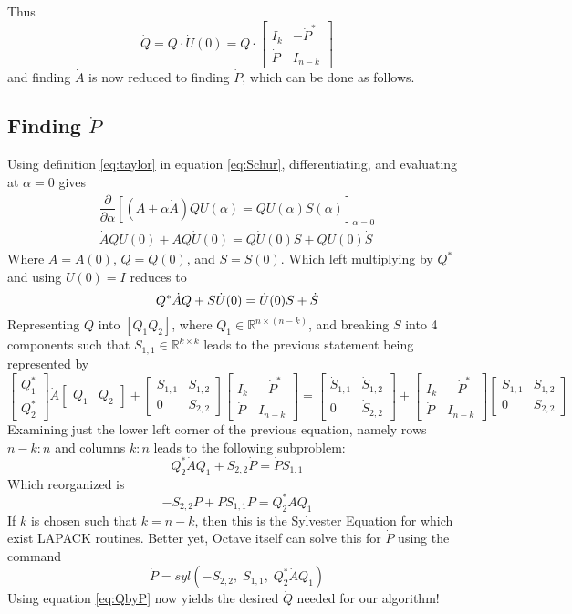 \documentclass[fleqn,12pt]{article}
\newcommand{\bmatTt}[2]{\begin{bmatrix} #1 \\ #2 \end{bmatrix}}
\newcommand{\bmatTw}[2]{\begin{bmatrix} #1 & #2 \end{bmatrix}}
\newcommand{\bmatF}[4]{\begin{bmatrix} #1 & #2\\ #3 & #4 \end{bmatrix}}
\begin{document}
Thus
\begin{equation}\label{eq:QbyP}
  \dot{Q} = Q \cdot \dot{U}(0) = Q \cdot \begin{bmatrix}
    I_k & - \dot{P}^*\\
    \dot{P} & I_{n-k}
  \end{bmatrix}
\end{equation}
and finding $\dot{A}$ is now reduced to finding $\dot{P}$, which can be done as follows.

\subsection{Finding $\dot{P}$}

Using definition \ref{eq:taylor} in equation \ref{eq:Schur}, differentiating, and evaluating at $\alpha = 0$ gives
\begin{gather}
  \dfrac{\partial}{\partial \alpha} 
  \left[ 
    (A + \alpha \dot{A}) Q U(\alpha) = Q U(\alpha) S(\alpha)  
  \right]_{\alpha = 0}\\
  \dot{A} Q U(0) + A Q \dot{U}(0) = Q \dot{U}(0) S + Q U(0) \dot{S}
\end{gather}
Where $A = A(0)$, $Q = Q(0)$, and $S = S(0)$.
Which left multiplying by $Q^*$ and using $U(0) = I$ reduces to
\begin{equation}
  Q^* \dot{A} Q + S \dot{U}(0) = \dot{U}(0) S + \dot{S}\\
\end{equation}
Representing $Q$ into $[ Q_1 Q_2]$, where $Q_1 \in \mathbb{R}^{n \times (n-k)}$,
and breaking $S$ into 4 components such that $S_{1,1} \in \mathbb{R}^{k \times k}$ leads
to the previous statement being represented by
\begin{equation}
  \bmatTt{Q_1^*}{Q_2^*} \dot{A} \bmatTw{Q_1}{Q_2} + 
  \bmatF{S_{1,1}}{S_{1,2}}{0}{S_{2,2}} \bmatF{I_k}{-\dot{P}^*}{\dot{P}}{I_{n-k}} = 
  \bmatF{\dot{S}_{1,1}}{\dot{S}_{1,2}}{0}{\dot{S}_{2,2}} + 
  \bmatF{I_k}{-\dot{P}^*}{\dot{P}}{I_{n-k}} \bmatF{S_{1,1}}{S_{1,2}}{0}{S_{2,2}}
\end{equation}
Examining just the lower left corner of the previous equation, namely rows $n-k : n$ and columns $k:n$
leads to the following subproblem:
\begin{equation}
  Q_2^* \dot{A} Q_1 + S_{2,2} \dot{P} = \dot{P} S_{1,1}
\end{equation}
Which reorganized is
\begin{equation}
  -S_{2,2} \dot{P} + \dot{P} S_{1,1} \dot{P} = Q_2^* \dot{A} Q_1
\end{equation}
If $k$ is chosen such that $k = n - k$, then this is the Sylvester Equation for which exist LAPACK routines.
Better yet, Octave itself can solve this for $\dot{P}$ using the command
\begin{equation}
  \dot{P} = syl \left( -S_{2,2} , \; S_{1,1} , \; Q_2^* \dot{A} Q_1 \right)
\end{equation}
Using equation \ref{eq:QbyP} now yields the desired $\dot{Q}$ needed for our algorithm!
\end{document}
